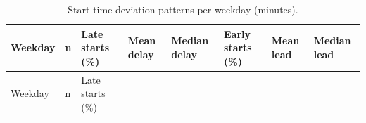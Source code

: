 \documentclass[
]{article}
\begin{document}
\begin{longtable}[]{@{}
  >{\centering\arraybackslash}p{}
  >{\centering\arraybackslash}p{}
  >{\centering\arraybackslash}p{}
  >{\centering\arraybackslash}p{}
  >{\centering\arraybackslash}p{}
  >{\centering\arraybackslash}p{}
  >{\centering\arraybackslash}p{}
  >{\centering\arraybackslash}p{}@{}}
\caption{Start-time deviation patterns per weekday (minutes).
\label{tab:start_diff_weekday}}\tabularnewline
\toprule\noalign{}
\begin{minipage}[b]{\linewidth}\centering
Weekday
\end{minipage} & \begin{minipage}[b]{\linewidth}\centering
n
\end{minipage} & \begin{minipage}[b]{\linewidth}\centering
Late starts (\%)
\end{minipage} & \begin{minipage}[b]{\linewidth}\centering
Mean delay
\end{minipage} & \begin{minipage}[b]{\linewidth}\centering
Median delay
\end{minipage} & \begin{minipage}[b]{\linewidth}\centering
Early starts (\%)
\end{minipage} & \begin{minipage}[b]{\linewidth}\centering
Mean lead
\end{minipage} & \begin{minipage}[b]{\linewidth}\centering
Median lead
\end{minipage} \\
\midrule\noalign{}
\endfirsthead
\toprule\noalign{}
\begin{minipage}[b]{\linewidth}\centering
Weekday
\end{minipage} & \begin{minipage}[b]{\linewidth}\centering
n
\end{minipage} & \begin{minipage}[b]{\linewidth}\centering
Late starts (\%)
\end{minipage} & \begin{minipage}[b]{\linewidth}\centering

\end{minipage}
\end{longtable}
\end{document}
